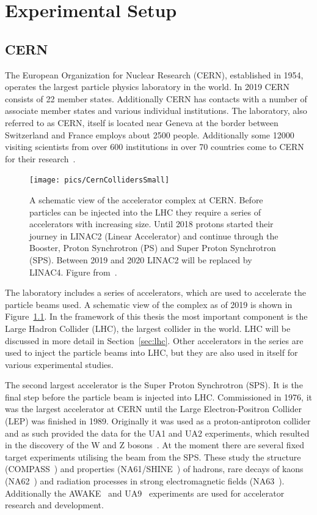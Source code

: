 
\chapter{Experimental Setup}
\label{sec:exp}
\section{CERN}
The European Organization for Nuclear Research (CERN), established in 1954, operates the largest particle physics laboratory in the world. In 2019 CERN consists of 22 member states. Additionally CERN has contacts with a number of associate member states and various individual institutions. The laboratory, also referred to as CERN, itself is located near Geneva at the border between Switzerland and France employs about 2500 people. Additionally some 12000 visiting scientists from over 600 institutions in over 70 countries come to CERN for their research~\cite{CERN}.

\begin{figure}[tb]
\centering
\texttt{[image: pics/CernCollidersSmall]}
\caption[CERN collider complex]{ A schematic view of the accelerator complex at CERN. Before particles can be injected into the LHC they require a series of accelerators with increasing size. Until 2018 protons started their journey in LINAC2 (Linear Accelerator) and continue through the Booster, Proton Synchrotron (PS) and Super Proton Synchrotron (SPS). Between 2019 and 2020 LINAC2 will be replaced by LINAC4. Figure from~\cite{CernComplex}.}
\label{fig:CernComplex}
\end{figure}

The laboratory includes a series of accelerators, which are used to accelerate the particle beams used. A schematic view of the complex as of 2019 is shown in Figure~\ref{fig:CernComplex}. In the framework of this thesis the most important component is the Large Hadron Collider (LHC), the largest collider in the world. LHC will be discussed in more detail in Section~\ref{sec:lhc}. Other accelerators in the series are used to inject the particle beams into LHC, but they are also used in itself for various experimental studies. 

The second largest accelerator is the Super Proton Synchrotron (SPS). It is the final step before the particle beam is injected into LHC. Commissioned in 1976, it was the largest accelerator at CERN until the Large Electron-Positron Collider (LEP) was finished in 1989. Originally it was used as a proton-antiproton collider and as such provided the data for the UA1 and UA2 experiments, which resulted in the discovery of the W and Z bosons~\cite{Watkins:1986va}. At the moment there are several fixed target experiments utilising the beam from the SPS. These study the structure (COMPASS~\cite{COMPASS}) and properties (NA61/SHINE~\cite{Laszlo:2009vg}) of hadrons, rare decays of kaons (NA62~\cite{Hahn:1404985}) and radiation processes in strong electromagnetic fields (NA63~\cite{Mikkelsen:1955391}). Additionally the AWAKE~\cite{Dobert:2669231} and UA9~\cite{Losito:1223625} experiments are used for accelerator research and development. 

